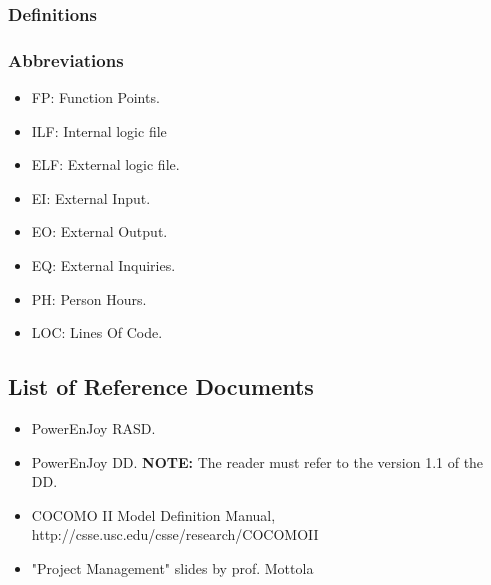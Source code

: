 \subsubsection{Definitions}

\subsubsection{Abbreviations}
\begin{itemize}
	\item  FP: Function Points.
	\item  ILF: Internal logic file
	\item  ELF: External logic file.
	\item  EI: External Input.
	\item  EO: External Output.
	\item  EQ: External Inquiries.
	\item PH: Person Hours.
	\item LOC: Lines Of Code.
\end{itemize}



\subsection{List of Reference Documents}
\begin{itemize}
	\item PowerEnJoy RASD.	
	\item PowerEnJoy DD.
	\textbf{NOTE:} The reader must refer to the version 1.1 of the DD.
	\item COCOMO II Model Definition Manual, http://csse.usc.edu/csse/research/COCOMOII
	\item "Project Management" slides by prof. Mottola 
\end{itemize}

